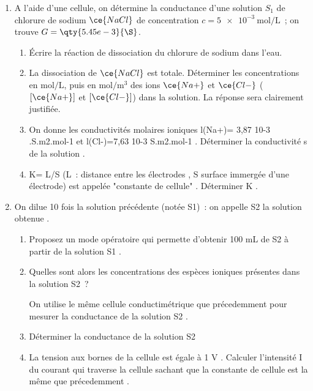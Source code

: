 \begin{enumerate}
    \item A l'aide d'une cellule, on détermine la conductance d'une solution
          $S_{1}$ de chlorure de sodium $\ce{NaCl}$ de concentration
          $c=\qty{5e-3}{\mol\per\L}$~; on trouve $G=\qty{5.45e-3}{\S}$.
          \begin{enumerate}
              \item Écrire la réaction de dissociation du chlorure de sodium
                    dans l'eau.
              \item La dissociation de $\ce{NaCl}$ est totale. Déterminer les
                    concentrations en $\unit{\mol\per\L}$, puis en
                    $\unit{\mol\per\cubic\m}$ des ions $\ce{Na+}$ et $\ce{Cl-}$
                    ($[\ce{Na+}]$ et $[\ce{Cl-}]$) dans la solution. La réponse
                    sera clairement justifiée.
              \item On donne les conductivités molaires ioniques l(Na+)= 3,87 10-3 .S.m2.mol-1 et l(Cl-)=7,63 10-3 S.m2.mol-1 . Déterminer la conductivité s de la solution .
              \item K= L/S (L~: distance entre les électrodes , S surface immergée d'une électrode) est appelée "constante de cellule" . Déterminer K .
          \end{enumerate}
    
    \item On dilue 10 fois la solution précédente (notée S1)~: on appelle S2 la solution obtenue .
          \begin{enumerate}
              \item Proposez un mode opératoire qui permette d'obtenir 100 mL de S2 à partir de la solution S1 .
              \item Quelles sont alors les concentrations des espèces ioniques présentes dans la solution S2~?
              
                  On utilise le même cellule conductimétrique que précedemment pour mesurer la conductance de la solution S2 .
              \item Déterminer la conductance de la solution S2
              \item La tension aux bornes de la cellule est égale à 1 V . Calculer l'intensité I du courant qui traverse la cellule sachant que la constante de cellule est la même que précedemment .
          \end{enumerate}
\end{enumerate}
